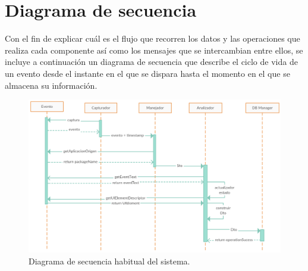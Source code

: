 \documentclass[12pt,a4paper,oneside]{book} %
\begin{document}
\section{Diagrama de secuencia}
Con el fin de explicar cuál es el flujo que recorren los datos y las operaciones que realiza cada componente así como los mensajes que se intercambian entre ellos, se incluye a continuación un diagrama de secuencia que describe el ciclo de vida de un evento desde el instante en el que se dispara hasta el momento en el que se almacena su información. 
\begin{figure}[H]
  \begin{center}
     \includegraphics[scale=0.22]{pictures/secuencediagrams/diagrama_seq_flujo.png}
  \end{center}
  \caption[Diagrama de secuencia]{Diagrama de secuencia habitual del sistema.}
    \label{fig:LandscapeFigure}
\end{figure}
\end{document}
